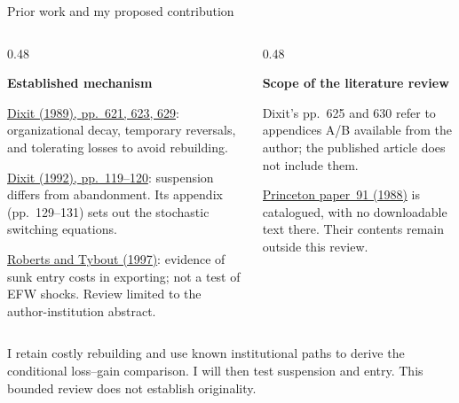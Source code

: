 \documentclass[aspectratio=169,11pt]{beamer}
\newcommand{\kwTurq}[1]{{\color{turquoise}#1}}
\newcommand{\labeltext}[1]{{\small\bfseries\color{blue}#1\par}\vspace{1.5mm}}
\newcommand{\takeaway}[1]{\par\vspace{2.5mm}\begingroup\setlength{\fboxsep}{2.5mm}\colorbox{pale}{\begin{minipage}{\dimexpr\linewidth-5mm\relax}\small #1\end{minipage}}\endgroup\par}
\begin{document}
\begin{frame}{Prior work and \kwTurq{my proposed contribution}}
 \begin{columns}[T,onlytextwidth]
 \begin{column}{0.48\textwidth}
 \labeltext{Established mechanism}
 \small \href{https://doi.org/10.1086/261619}{Dixit (1989), pp.~621, 623, 629}: organizational decay,
 temporary reversals, and tolerating losses to avoid rebuilding.\par\vspace{3mm}
 \href{https://doi.org/10.1257/jep.6.1.107}{Dixit (1992), pp.~119--120}: suspension differs from abandonment.
 Its appendix (pp.~129--131) sets out the stochastic switching equations.\par\vspace{3mm}
 \href{https://pure.psu.edu/en/publications/the-decision-to-export-in-colombia-an-empirical-model-of-entry-wi/}{Roberts and Tybout (1997)}: evidence of sunk entry costs in exporting;
 not a test of EFW shocks. Review limited to the author-institution abstract.
 \end{column}
 \begin{column}{0.48\textwidth}
 \labeltext{Scope of the literature review}
 \small Dixit's pp.~625 and 630 refer to appendices A/B available from the author;
 the published article does not include them.\par\vspace{4mm}
 \href{https://econpapers.repec.org/RePEc:fth:prinec:91}{Princeton paper~91 (1988)} is catalogued,
 with no downloadable text there. Their contents remain outside this review.
 \end{column}
 \end{columns}
 \vspace{4mm}
 \takeaway{I retain costly rebuilding and use known institutional paths to derive the conditional loss--gain comparison.
 I will then test suspension and entry. This bounded review does not establish originality.}
\end{frame}
\end{document}
